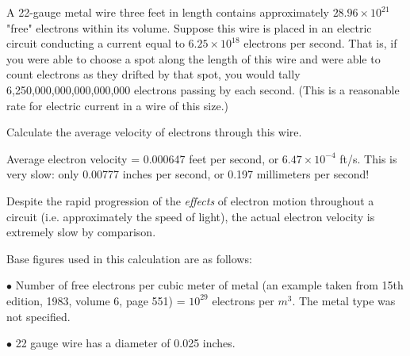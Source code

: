 

A 22-gauge metal wire three feet in length contains approximately $28.96 \times 10^{21}$ "free" electrons within its volume.  Suppose this wire is placed in an electric circuit conducting a current equal to $6.25 \times 10^{18}$ electrons per second.  That is, if you were able to choose a spot along the length of this wire and were able to count electrons as they drifted by that spot, you would tally 6,250,000,000,000,000,000 electrons passing by each second.  (This is a reasonable rate for electric current in a wire of this size.)

Calculate the average velocity of electrons through this wire.







Average electron velocity = 0.000647 feet per second, or $6.47 \times 10^{-4}$ ft/s.  This is very slow: only 0.00777 inches per second, or 0.197 millimeters per second!







Despite the rapid progression of the {\it effects} of electron motion throughout a circuit (i.e. approximately the speed of light), the actual electron velocity is extremely slow by comparison.

Base figures used in this calculation are as follows:

\vskip 10pt

\item {$\bullet$} Number of free electrons per cubic meter of metal (an example taken from  15th edition, 1983, volume 6, page 551) = $10^{29}$ electrons per $m^3$.  The metal type was not specified.
\item {$\bullet$} 22 gauge wire has a diameter of 0.025 inches.

\vskip 10pt

